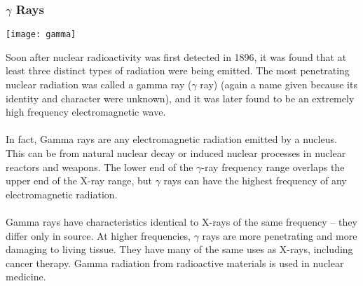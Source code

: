 \documentclass[11pt]{article}
\begin{document}
	\subsubsection*{$\gamma$ Rays}
	\begin{center}
		\texttt{[image: gamma]}
	\end{center}
	Soon after nuclear radioactivity was first detected in 1896, it was found that at least three distinct types of radiation were being emitted. The most penetrating nuclear radiation was called a gamma ray ($\gamma$ ray) (again a name given because its identity and character were unknown), and it was later found to be an extremely high frequency electromagnetic wave. \\ \\
	In fact,  Gamma rays are any electromagnetic radiation emitted by a nucleus. This can be from natural nuclear decay or induced nuclear processes in nuclear reactors and weapons. The lower end of the  $\gamma$-ray frequency range overlaps the upper end of the X-ray range, but  $\gamma$ rays can have the highest frequency of any electromagnetic radiation. \\ \\
	Gamma rays have characteristics identical to X-rays of the same frequency -- they differ only in source. At higher frequencies,  $\gamma$ rays are more penetrating and more damaging to living tissue. They have many of the same uses as X-rays, including cancer therapy. Gamma radiation from radioactive materials is used in nuclear medicine.
	
	
	
	
	
	
	
	
	
	
	
	
	
\end{document}
